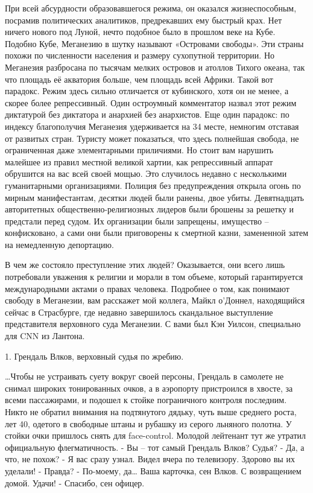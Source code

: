 \documentclass{book}
\begin{document}
При всей абсурдности образовавшегося режима, он оказался жизнеспособным, посрамив политических аналитиков, предрекавших ему быстрый крах. Нет ничего нового под Луной, нечто подобное было в прошлом веке на Кубе. Подобно Кубе, Меганезию в шутку называют «Островами свободы». Эти страны похожи по численности населения и размеру сухопутной территории. Но Меганезия разбросана по тысячам мелких островов и атоллов Тихого океана, так что площадь её акватория больше, чем площадь всей Африки. Такой вот парадокс. Режим здесь сильно отличается от кубинского, хотя он не менее, а скорее более репрессивный. Один остроумный комментатор назвал этот режим диктатурой без диктатора и анархией без анархистов. Еще один парадокс: по индексу благополучия Меганезия удерживается на 34 месте, немногим отставая от развитых стран. Туристу может показаться, что здесь полнейшая свобода, не ограниченная даже элементарными приличиями. Но стоит вам нарушить малейшее из правил местной великой хартии, как репрессивный аппарат обрушится на вас всей своей мощью. Это случилось недавно с несколькими гуманитарными организациями. Полиция без предупреждения открыла огонь по мирным манифестантам, десятки людей были ранены, двое убиты. Девятнадцать авторитетных общественно-религиозных лидеров были брошены за решетку и предстали перед судом. Их организации были запрещены, имущество -- конфисковано, а сами они были приговорены к смертной казни, замененной затем на немедленную депортацию.

В чем же состояло преступление этих людей? Оказывается, они всего лишь потребовали уважения к религии и морали в том объеме, который гарантируется международными актами о правах человека. Подробнее о том, как понимают свободу в Меганезии, вам расскажет мой коллега, Майкл о’Доннел, находящийся сейчас в Страсбурге, где недавно завершилось скандальное выступление представителя верховного суда Меганезии. С вами был Кэн Уилсон, специально для CNN из Лантона.

1. Грендаль Влков, верховный судья по жребию.


\ldots{}Чтобы не устраивать суету вокруг своей персоны, Грендаль в самолете не снимал широких тонированных очков, а в аэропорту пристроился в хвосте, за всеми пассажирами, и подошел к стойке пограничного контроля последним. Никто не обратил внимания на подтянутого дядьку, чуть выше среднего роста, лет 40, одетого в свободные штаны и рубашку из серого льняного полотна. У стойки очки пришлось снять для face-control.
Молодой лейтенант тут же утратил официальную флегматичность.
- Вы -- тот самый Грендаль Влков? Судья?
- Да, а что, не похож?
- Я вас сразу узнал. Видел вчера по телевизору. Здорово вы их уделали!
- Правда?
- По-моему, да\ldots{} Ваша карточка, сен Влков. С возвращением домой. Удачи!
- Спасибо, сен офицер.
\end{document}
